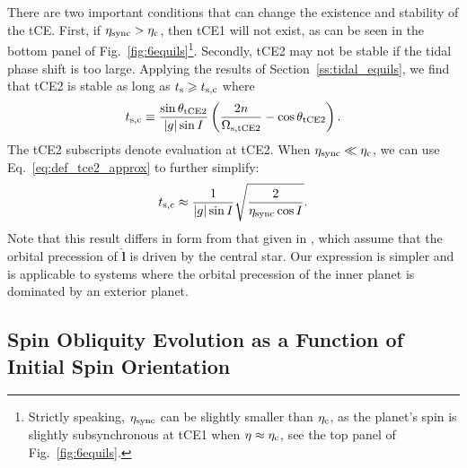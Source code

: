 \documentclass[
        fleqn,
        usenatbib,
    ]{mnras}
\newcommand*{\abs}[1]{\left|#1\right|}
\newcommand*{\p}[1]{\left(#1\right)}
\newcommand*{\uv}[1]{\hat{\boldsymbol{\mathbf{#1}}}}
\begin{document}
There are two important conditions that can change the existence and stability
of the tCE\@. First, if $\eta_{\rm sync} > \eta_{\rm c}$, then tCE1 will not
exist, as can be seen in the bottom panel of
Fig.~\ref{fig:6equils}\footnote{Strictly speaking, $\eta_{\rm sync}$ can be
slightly smaller than $\eta_{\rm c}$, as the planet's spin is slightly
subsynchronous at tCE1 when $\eta \approx \eta_{\rm c}$, see the top panel of
Fig.~\ref{fig:6equils}.}. Secondly, tCE2 may not be stable if the tidal phase
shift is too large. Applying the results of Section~\ref{ss:tidal_equils}, we
find that tCE2 is stable as long as $t_{\rm s} \geq t_{\rm s, c}$ where
\begin{equation}
    t_{\rm s, c} \equiv \frac{\sin \theta_{\rm tCE2}}{\abs{g} \sin
            I}\p{\frac{2n}{\Omega_{\rm s, tCE2}} - \cos \theta_{\rm tCE2}}.
\end{equation}
The tCE2 subscripts denote evaluation at tCE2. When $\eta_{\rm sync} \ll
\eta_{\rm c}$, we can use Eq.~\eqref{eq:def_tce2_approx} to further simplify:
\begin{equation}
    t_{\rm s, c}\approx \frac{1}{\abs{g}\sin I}\sqrt{\frac{2}{\eta_{\rm sync}
        \cos I}}. \label{eq:def_ts_crit}
\end{equation}
Note that this result differs in form from that given in
\citet{fabrycky_otides}, which assume that the orbital precession of $\uv{l}$ is
driven by the central star. Our expression is simpler and is applicable to
systems where the orbital precession of the inner planet is dominated by an
exterior planet.

\subsection{Spin Obliquity Evolution as a Function of Initial Spin Orientation}
\end{document}
